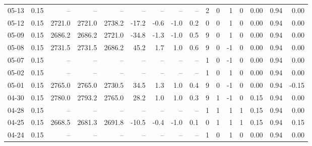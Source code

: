 \begin{threeparttable}
{\begin{tabular}{lrrrrrrrrrrrrrrr}
  05-13 &     0.15 &     -- &     -- &     -- &         -- &             -- &                       -- &                  -- &              2 &         0 &     1 &         0 &       0.00 &      0.94 &           0.00 \\
  05-12 &     0.15 & 2721.0 & 2721.0 & 2738.2 &      -17.2 &           -0.6 &                     -1.0 &                 0.2 &              0 &         0 &     1 &         0 &       0.00 &      0.94 &           0.00 \\
  05-09 &     0.15 & 2686.2 & 2686.2 & 2721.0 &      -34.8 &           -1.3 &                     -1.0 &                 0.5 &              9 &         0 &     1 &         0 &       0.00 &      0.94 &           0.00 \\
  05-08 &     0.15 & 2731.5 & 2731.5 & 2686.2 &       45.2 &            1.7 &                      1.0 &                 0.6 &              9 &         0 &    -1 &         0 &       0.00 &      0.94 &           0.00 \\
  05-07 &     0.15 &     -- &     -- &     -- &         -- &             -- &                       -- &                  -- &              1 &         0 &    -1 &         0 &       0.00 &      0.94 &           0.00 \\
  05-02 &     0.15 &     -- &     -- &     -- &         -- &             -- &                       -- &                  -- &              1 &         0 &     1 &         0 &       0.00 &      0.94 &           0.00 \\
  05-01 &     0.15 & 2765.0 & 2765.0 & 2730.5 &       34.5 &            1.3 &                      1.0 &                 0.4 &              9 &         0 &    -1 &         0 &       0.00 &      0.94 &          -0.15 \\
  04-30 &     0.15 & 2780.0 & 2793.2 & 2765.0 &       28.2 &            1.0 &                      1.0 &                 0.3 &              9 &         1 &    -1 &         0 &       0.15 &      0.94 &           0.00 \\
  04-28 &     0.15 &     -- &     -- &     -- &         -- &             -- &                       -- &                  -- &              1 &         1 &     1 &         1 &       0.15 &      0.94 &           0.00 \\
  04-25 &     0.15 & 2668.5 & 2681.3 & 2691.8 &      -10.5 &           -0.4 &                     -1.0 &                 0.1 &              0 &         1 &     1 &         1 &       0.15 &      0.94 &           0.15 \\
  04-24 &     0.15 &     -- &     -- &     -- &         -- &             -- &                       -- &                  -- &              1 &         0 &     1 &         0 &       0.00 &      0.94 &           0.00 \\

\end{tabular}}
\end{threeparttable}
